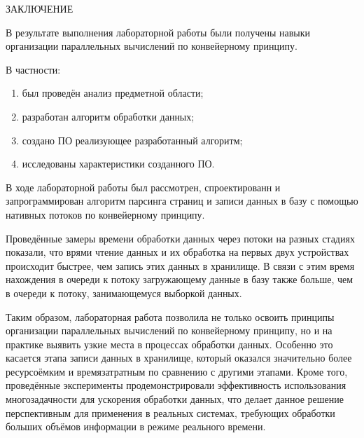 \begin{center}
    \MakeUppercase{\large Заключение}
\end{center}

В результате выполнения лабораторной работы были получены навыки организации параллельных вычислений по конвейерному принципу.

\vspace{0.25cm}
В частности:

\begin{enumerate}

\item был проведён анализ предметной области;

\item разработан алгоритм обработки данных;

\item создано ПО реализующее разработанный алгоритм;

\item исследованы характеристики созданного ПО.

\end{enumerate}

В ходе лабораторной работы был рассмотрен, спроектированн и запрограммирован алгоритм парсинга страниц и записи данных в базу с помощью нативных потоков по конвейерному принципу.

Проведённые замеры времени обработки данных через потоки на разных стадиях показали, что врями чтение данных и их обработка на первых двух устройствах происходит быстрее, чем запись этих данных в хранилище. В связи с этим время нахождения в очереди к потоку загружающему данные в базу также больше, чем в очереди к потоку, занимающемуся выборкой данных.

Таким образом, лабораторная работа позволила не только освоить принципы организации параллельных вычислений по конвейерному принципу, но и на практике выявить узкие места в процессах обработки данных. Особенно это касается этапа записи данных в хранилище, который оказался значительно более ресурсоёмким и времязатратным по сравнению с другими этапами. Кроме того, проведённые эксперименты продемонстрировали эффективность использования многозадачности для ускорения обработки данных, что делает данное решение перспективным для применения в реальных системах, требующих обработки больших объёмов информации в режиме реального времени.

\newpage